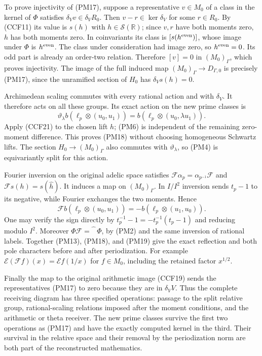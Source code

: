 \documentclass[11pt,a4paper]{article}
\theoremstyle{definition}\newtheorem{definition}[theorem]{Definition}
\begin{document}
To prove injectivity of (PM17), suppose a representative
$v\in M_0$ of a class in the kernel of $\Phi$ satisfies
$\delta_Vv\in\delta_VR_0$. Then $v-r\in\ker\delta_V$ for
some $r\in R_0$. By (CCF11) its value is $s(h)$ with
$h\in\mathcal S(\mathbb R)$; since $v,r$ have both moments
zero, $h$ has both moments zero. In coinvariants its class
is $[s(h^{\rm even})]$, whose image under $\Phi$ is
$h^{\rm even}$. The class under consideration had image
zero, so $h^{\rm even}=0$. Its odd part is already an
order-two relation. Therefore $[v]=0$ in $(M_0)_\Gamma$,
which proves injectivity. The image of the full induced map
$(M_0)_\Gamma\to D_{\Gamma,0}$ is precisely (PM17), since
the unramified section of $H_0$ has $\delta_Vs(h)=0$.

Archimedean scaling commutes with every rational action and
with $\delta_V$. It therefore acts on all these groups.
Its exact action on the new prime classes is
\[
 \vartheta_\lambda b(\ell_p\otimes(u_0,u_1))
      =b(\ell_p\otimes(u_0,\lambda u_1)).
 \tag{PM18}
\]
Apply (CCF21) to the chosen lift $h$; (PM6) is independent of
the remaining zero-moment difference. This proves (PM18)
without choosing homogeneous Schwartz lifts. The section
$H_0\to(M_0)_\Gamma$ also commutes with $\vartheta_\lambda$,
so (PM4) is equivariantly split for this action.

Fourier inversion on the original adelic space satisfies
$\mathcal F\alpha_p=\alpha_{p^{-1}}\mathcal F$ and
$\mathcal Fs(h)=s(\widehat h)$. It induces a map on
$(M_0)_\Gamma$. In $I/I^2$ inversion sends $t_p-1$ to its
negative, while Fourier exchanges the two moments. Hence
\[
 \mathcal F b(\ell_p\otimes(u_0,u_1))
       =-b(\ell_p\otimes(u_1,u_0)).
 \tag{PM19}
\]
One may verify the sign directly by
$t_p^{-1}-1=-t_p^{-1}(t_p-1)$ and reducing modulo $I^2$.
Moreover $\Phi\mathcal F=\widehat{\phantom h}\,\Phi$,
by (PM2) and the same inversion of rational labels.
Together (PM13), (PM18), and (PM19) give the exact reflection
and both pole characters before and after periodization.
For example
$\mathcal E(\mathcal F f)(x)=\mathcal E f(1/x)$
for $f\in M_0$, including the retained factor $x^{1/2}$.

Finally the map to the original arithmetic image (CCF19)
sends the representatives (PM17) to zero because they are
in $\delta_VV$. Thus the complete receiving diagram has
three specified operations: passage to the split relative
group, rational-scaling relations imposed after the moment
conditions, and the arithmetic or theta receiver. The new
prime classes survive the first two operations as (PM17)
and have the exactly computed kernel in the third. Their
survival in the relative space and their removal by the
periodization norm are both part of the reconstructed
mathematics.
\end{document}
